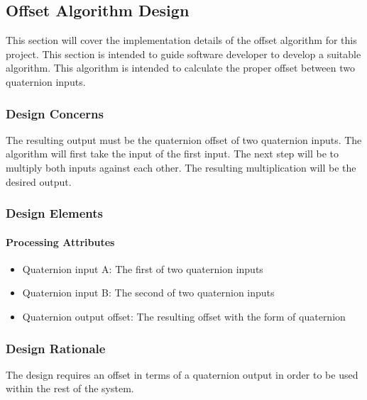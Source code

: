 	\subsection{Offset Algorithm Design}
	This section will cover the implementation details of the offset algorithm for this project. This section is intended to guide software developer to develop a suitable algorithm. This algorithm is intended to calculate the proper offset between two quaternion inputs.\\

		\subsubsection{Design Concerns}
		The resulting output must be the quaternion offset of two quaternion inputs. The algorithm will first take the input of the first input. The next step will be to multiply both inputs against each other. The resulting multiplication will be the desired output.\\

		\subsubsection{Design Elements}
			\paragraph{Processing Attributes}
					\begin{itemize}
						\item Quaternion input A: The first of two quaternion inputs
						\item Quaternion input B: The second of two quaternion inputs
						\item Quaternion output offset: The resulting offset with the form of quaternion\\
					\end{itemize}

		\subsubsection{Design Rationale}
		The design requires an offset in terms of a quaternion output in order to be used within the rest of the system. 

































